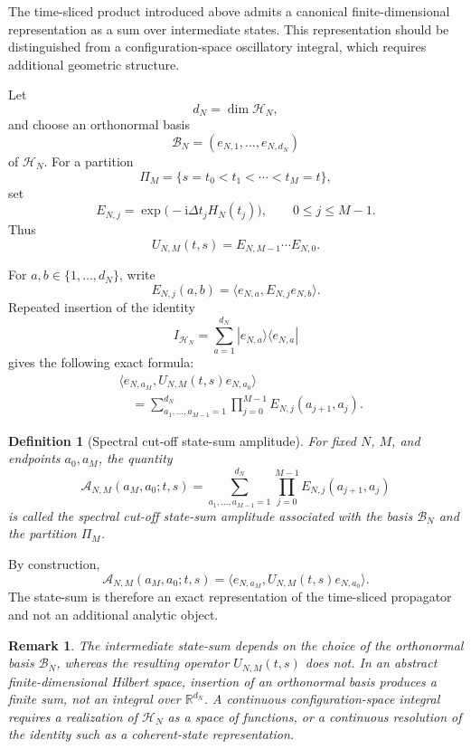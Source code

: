 \documentclass[10pt,a4paper]{amsart}
\newtheorem{definition}[theorem]{Definition}
\newtheorem{remark}[theorem]{Remark}
\begin{document}
The time-sliced product introduced above admits a canonical finite-dimensional
representation as a sum over intermediate states. This representation should
be distinguished from a configuration-space oscillatory integral, which
requires additional geometric structure.

Let
\[
d_{N}=\dim\mathcal{H}_{N},
\]
and choose an orthonormal basis
\[
\mathcal{B}_{N}=(e_{N,1},\ldots,e_{N,d_{N}})
\]
of \(\mathcal{H}_{N}\). For a partition
\[
\Pi_{M}=\{s=t_{0}<t_{1}<\cdots<t_{M}=t\},
\]
set
\[
E_{N,j}
=
\exp\bigl(-\mathrm{i}\Delta t_{j}H_{N}(t_{j})\bigr),
\qquad
0\leq j\leq M-1.
\]
Thus
\[
U_{N,M}(t,s)
=
E_{N,M-1}\cdots E_{N,0}.
\]

For \(a,b\in\{1,\ldots,d_{N}\}\), write
\[
E_{N,j}(a,b)
=
\langle e_{N,a},E_{N,j}e_{N,b}\rangle.
\]
Repeated insertion of the identity
\[
I_{\mathcal{H}_{N}}
=
\sum_{a=1}^{d_{N}}
|e_{N,a}\rangle\langle e_{N,a}|
\]
gives the following exact formula:
\[
\begin{split}
&\langle e_{N,a_{M}},U_{N,M}(t,s)e_{N,a_{0}}\rangle
\\
&\quad=
\sum_{a_{1},\ldots,a_{M-1}=1}^{d_{N}}
\prod_{j=0}^{M-1}
E_{N,j}(a_{j+1},a_{j}).
\end{split}
\]

\begin{definition}[Spectral cut-off state-sum amplitude]
\label{def:spectral-cutoff-state-sum}
For fixed \(N\), \(M\), and endpoints \(a_{0},a_{M}\), the quantity
\[
\mathcal{A}_{N,M}(a_{M},a_{0};t,s)
=
\sum_{a_{1},\ldots,a_{M-1}=1}^{d_{N}}
\prod_{j=0}^{M-1}
E_{N,j}(a_{j+1},a_{j})
\]
is called the spectral cut-off state-sum amplitude associated with the basis
\(\mathcal{B}_{N}\) and the partition \(\Pi_{M}\).
\end{definition}

By construction,
\[
\mathcal{A}_{N,M}(a_{M},a_{0};t,s)
=
\langle e_{N,a_{M}},U_{N,M}(t,s)e_{N,a_{0}}\rangle.
\]
The state-sum is therefore an exact representation of the time-sliced
propagator and not an additional analytic object.

\begin{remark}
\label{rem:basis-dependence-state-sum}
The intermediate state-sum depends on the choice of the orthonormal basis
\(\mathcal{B}_{N}\), whereas the resulting operator \(U_{N,M}(t,s)\) does not.
In an abstract finite-dimensional Hilbert space, insertion of an orthonormal
basis produces a finite sum, not an integral over
\(\mathbb{R}^{d_{N}}\). A continuous configuration-space integral requires a
realization of \(\mathcal{H}_{N}\) as a space of functions, or a continuous
resolution of the identity such as a coherent-state representation.
\end{remark}
\end{document}
